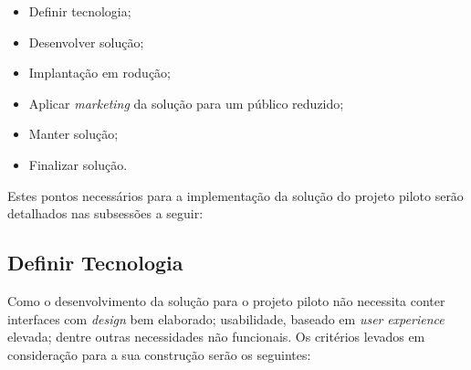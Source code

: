 \begin{itemize}
    \item Definir tecnologia;
    \item Desenvolver solução;
    \item Implantação em rodução;
    \item Aplicar \textit{marketing} da solução para um público reduzido;
    \item Manter solução;
    \item Finalizar solução.
\end{itemize}

Estes pontos necessários para a implementação da solução do projeto piloto serão detalhados 
nas subsessões a seguir:

\subsection{Definir Tecnologia}
\label{sub:definir_tecnologia}
Como o desenvolvimento da solução para o projeto piloto não necessita conter interfaces com \textit{design} bem elaborado;
usabilidade, baseado em \textit{user} \textit{experience} elevada; dentre outras necessidades não funcionais. Os critérios levados em
consideração para a sua construção serão os seguintes:

